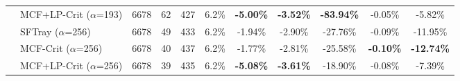 \begin{table}[t]
{\begin{tabular}{ll|cccc|ccc|cc}
 & MCF+LP-Crit ($\alpha$=193) & 6678 & 62 & 427 & 6.2\% & \textbf{-5.00\%} & \textbf{-3.52\%} & \textbf{-83.94\%} & -0.05\% & -5.82\% \\

\addlinespace[0.5em]

 & SFTray ($\alpha$=256) & 6678 & 49 & 433 & 6.2\% & -1.94\% & -2.90\% & -27.76\% & -0.09\% & -11.95\% \\

 & MCF-Crit ($\alpha$=256) & 6678 & 40 & 437 & 6.2\% & -1.77\% & -2.81\% & -25.58\% & \textbf{-0.10\%} & \textbf{-12.74\%} \\

 & MCF+LP-Crit ($\alpha$=256) & 6678 & 39 & 435 & 6.2\% & \textbf{-5.08\%} & \textbf{-3.61\%} & -18.90\% & -0.08\% & -7.39\% \\

\midrule

\bottomrule

\end{tabular}

}

\end{table}


